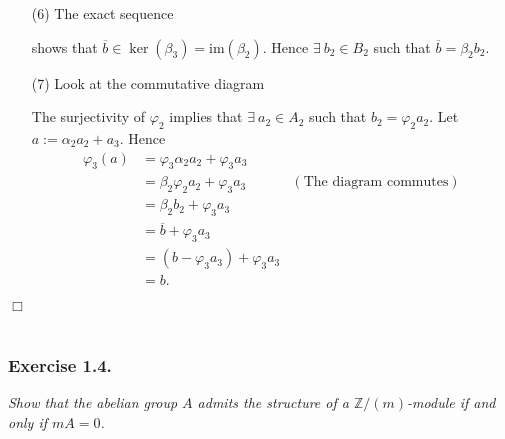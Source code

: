 \documentclass{article}
\begin{document}
\begin{enumerate}
\item[(6)]
  The exact sequence
  \begin{center}
  \end{center}
  shows that $\overline{b} \in \ker(\beta_3) = \mathrm{im}(\beta_2)$.
  Hence $\exists \: b_2 \in B_2$ such that $\overline{b} = \beta_2 b_2$.

\item[(7)]
  Look at the commutative diagram
  \begin{center}
  \end{center}
  The surjectivity of $\varphi_2$ implies that
  $\exists \: a_2 \in A_2$ such that $b_2 = \varphi_2 a_2$.
  Let $a := \alpha_2 a_2 + a_3$.
  Hence
  \begin{align*}
    \varphi_3(a)
    &= \varphi_3\alpha_2 a_2 + \varphi_3 a_3 \\
    &= \beta_2\varphi_2 a_2 + \varphi_3 a_3
      &(\text{The diagram commutes}) \\
    &= \beta_2 b_2 + \varphi_3 a_3 \\
    &= \overline{b} + \varphi_3 a_3 \\
    &= (b - \varphi_3 a_3) + \varphi_3 a_3 \\
    &= b.
  \end{align*}
\end{enumerate}
$\Box$ \\\\






\subsubsection*{Exercise 1.4.}
\emph{Show that the abelian group $A$ admits the structure of a $\mathbb{Z}/(m)$-module
if and only if $mA = 0$.} \\
\end{document}
